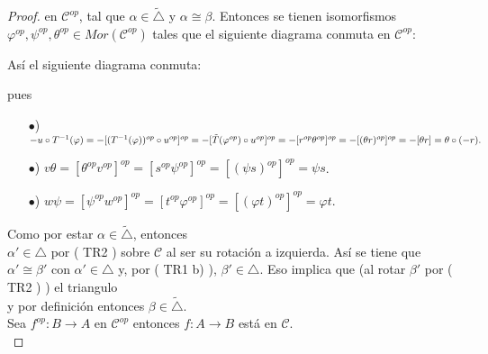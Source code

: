 \documentclass{article}
\begin{document}
\begin{enumerate}[label=\textbf{Ej \arabic*.}]
\begin{proof}
			en $\mathscr{C}^{op}$, tal que $\alpha\in \tilde{\triangle}$ y $\alpha\cong \beta$. Entonces se tienen isomorfismos \\
			$\varphi^{op}, \psi^{op}, \theta^{op}\in Mor(\mathscr{C}^{op})$ tales que el siguiente diagrama conmuta en $\mathscr{C}^{op}$:\\
			
			\centerline{
			}
			Así el siguiente diagrama conmuta:\\
			\centerline{
			}
			
			pues \begin{itemize} 
				\item[$\bullet$)] $-u\circ T^{-1}(\varphi)=-[( T^{-1}(\varphi))^{op}\circ u^{op}]^{op}=-[\tilde{T}(\varphi^{op})\circ u^{op}]^{op}\\
				=-[r^{op}\theta^{op}]^{op}=-[(\theta r)^{op}]^{op}=-[\theta r]=\theta\circ (-r).$
				\item[$\bullet$)] $v\theta=[\theta^{op}v^{op}]^{op}=[s^{op}\psi^{op}]^{op}=[( \psi s)^{op}]^{op}=\psi s$.
				\item[$\bullet$)] $w\psi=[\psi^{op}w^{op}]^{op}=[t^{op}\varphi^{op}]^{op}=[(\varphi t)^{op}]^{op}=\varphi t$.
			\end{itemize}
			
			Como  por estar $\alpha\in \tilde{\triangle}$, entonces \\
			$\alpha'\in \triangle$ por ( TR2 ) sobre $\mathscr{C}$ al ser su rotación a izquierda. 
			Así se tiene que $\alpha'\cong \beta'$ con $\alpha'\in \triangle$ y, por ( TR1 b) ), $\beta'\in \triangle$.
			Eso implica que (al rotar $\beta'$ por ( TR2 ) ) el triangulo  \\y por definición entonces 
			$\beta\in\tilde{\triangle}$.\\
			
			 Sea $f^{op}:B\to A$ en $\mathscr{C}^{op}$ entonces $f:A\to B$ está en $\mathscr{C}$. \\
			

\end{proof}
\end{enumerate}
\end{document}
